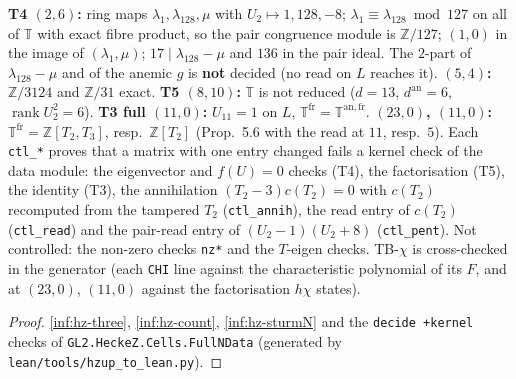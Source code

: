 \begin{theorem}\label{chk:hz-full-cells}
  \leanok
  \textbf{T4 $(2,6)$:} ring maps $\lambda_1,\lambda_{128},\mu$ with $U_2\mapsto1,128,-8$; $\lambda_1\equiv\lambda_{128}\bmod127$ on all of $\mathbb T$ with exact fibre product, so the pair congruence module is $\mathbb Z/127$; $(1,0)$ in the image of $(\lambda_1,\mu)$; $17\mid\lambda_{128}-\mu$ and $136$ in the pair ideal.
  The $2$-part of $\lambda_{128}-\mu$ and of the anemic $g$ is \textbf{not} decided (no read on $L$ reaches it). \textbf{$(5,4)$:} $\mathbb Z/3124$ and $\mathbb Z/31$ exact. \textbf{T5 $(8,10)$:} $\mathbb T$ is not reduced ($d=13$, $d^{\mathrm{an}}=6$, $\operatorname{rank}U_2^2=6$). \textbf{T3 full $(11,0)$:} $U_{11}=1$ on $L$, $\mathbb T^{\mathrm{fr}}=\mathbb T^{\mathrm{an,fr}}$.
  \textbf{$(23,0)$, $(11,0)$:} $\mathbb T^{\mathrm{fr}}=\mathbb Z[T_2,T_3]$, resp.\ $\mathbb Z[T_2]$ (Prop.~5.6 with the read at $11$, resp.\ $5$). Each \texttt{ctl\_*} proves that a matrix with one entry changed fails a kernel check of the data module: the eigenvector and
  $f(U)=0$ checks (T4), the factorisation (T5), the identity (T3), the annihilation $(T_2-3)c(T_2)=0$ with $c(T_2)$ recomputed from the tampered $T_2$
  (\texttt{ctl\_annih}), the read entry of $c(T_2)$ (\texttt{ctl\_read}) and the pair-read entry of $(U_2-1)(U_2+8)$ (\texttt{ctl\_pent}). Not
  controlled: the non-zero checks \texttt{nz*} and the $T$-eigen checks. TB-$\chi$ is cross-checked in the generator (each \texttt{CHI} line against the
  characteristic polynomial of its $F$, and at $(23,0)$, $(11,0)$ against the factorisation $h\chi$ states).
\end{theorem}
\begin{proof}
  \leanok
  \ref{inf:hz-three}, \ref{inf:hz-count}, \ref{inf:hz-sturmN} and the \texttt{decide +kernel} checks of \texttt{GL2.HeckeZ.Cells.FullNData} (generated by \texttt{lean/tools/hzup\_to\_lean.py}).
\end{proof}
